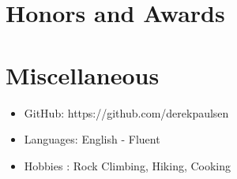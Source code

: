 \documentclass{resume}
\begin{document}
\section{Honors and Awards}

\section{Miscellaneous}
\begin{itemize}[parsep=0.5ex]
	\item GitHub: https://github.com/derekpaulsen
	\item Languages: English - Fluent
	\item Hobbies : Rock Climbing, Hiking, Cooking
\end{itemize}

%
%
\end{document}
